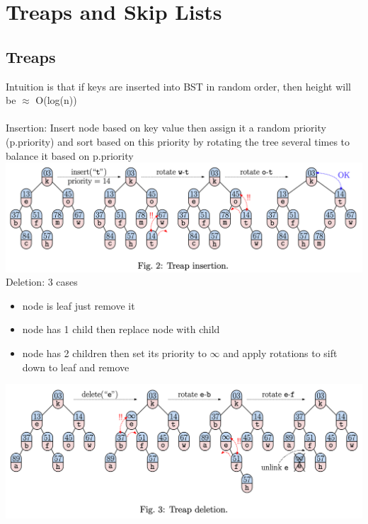 \documentclass{article}
\begin{document}
  \section{Treaps and Skip Lists}
  \subsection{Treaps}
  Intuition is that if keys are inserted into BST in random order, then height will be $\approx$ O(log(n))\\ \\
  Insertion: Insert node based on key value then assign it a random priority (p.priority) and sort based on this priority by rotating the tree several times to balance it based on p.priority\\
  \includegraphics[width=\textwidth]{TreapInsertion}
  Deletion: 3 cases
  \begin{itemize}[noitemsep]
  \item node is leaf just remove it
  \item node has 1 child then replace node with child
  \item node has 2 children then set its priority to $\infty$ and apply rotations to sift down to leaf and remove
  \end{itemize}
  \includegraphics[width=\textwidth]{TreapDeletion}
  \newpage
\end{document}
